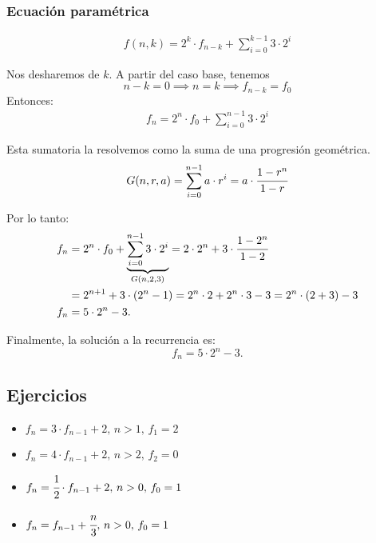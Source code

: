 \subsubsection{Ecuación paramétrica}
\begin{align*}
f(n,k)=2^k\cdot f_{n-k}+\sum_{i=0}^{k-1}{3\cdot 2^i}
\end{align*}

Nos desharemos de $k$. A partir del caso base, tenemos
$$n-k=0\implies n=k\implies f_{n-k}=f_0$$
Entonces:
\begin{align*}
f_n=2^n\cdot f_{0}+\sum_{i=0}^{n-1}{3\cdot 2^i}
\end{align*}

Esta sumatoria la resolvemos como la suma de una progresión geométrica.
\begin{align}
\label{eq:sum-geom}
G(n, r, a) = \sum_{i=0}^{n-1}{a\cdot r^i}=a\cdot\cfrac{1-r^n}{1-r}
\end{align}

Por lo tanto:
\begin{align*}
f_n&=2^n\cdot f_{0}+\underset{G(n,2,3)}{\underbrace{\sum_{i=0}^{n-1}{3\cdot 2^i}}}=2\cdot 2^{n}+3\cdot \cfrac{1-2^n}{1-2}\\
&=2^{n+1}+3\cdot (2^n-1)=2^n\cdot 2+2^n\cdot 3-3=2^n\cdot (2+3)-3\\
f_n&=5\cdot 2^n-3.
\end{align*}

Finalmente, la solución a la recurrencia es:
$$f_n=5\cdot 2^n-3.$$

\subsection{Ejercicios}
\begin{itemize}
\item $f_n=3\cdot f_{n-1}+2,\,n>1,\,f_1=2$
\item $f_n=4\cdot f_{n-1}+2,\,n>2,\,f_2=0$
\item $f_n=\cfrac{1}{2}\cdot f_{n-1}+2,\,n>0,\,f_0=1$
\item $f_n= f_{n-1}+\cfrac{n}{3},\,n>0,\,f_0=1$
\end{itemize}
